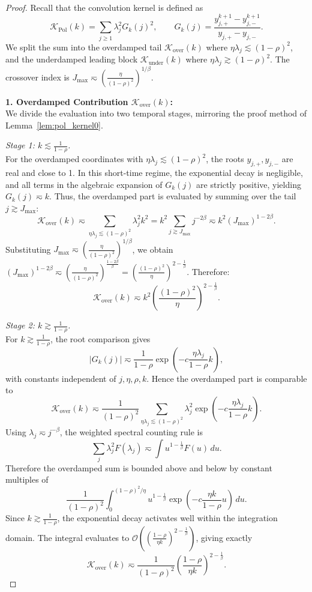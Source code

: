 \begin{proof}
Recall that the convolution kernel is defined as
\[
    \mathcal K_{\mathrm{Pol}}(k)=\sum_{j\ge1}\lambda_j^2G_k(j)^2,
    \qquad
    G_k(j)=\frac{y_{j,+}^{k+1}-y_{j,-}^{k+1}}{y_{j,+}-y_{j,-}}.
\]
We split the sum into the overdamped tail $\mathcal{K}_{\mathrm{over}}(k)$ where $\eta\lambda_j\lesssim(1-\rho)^2$, and the underdamped leading block $\mathcal{K}_{\mathrm{under}}(k)$ where $\eta\lambda_j\gtrsim(1-\rho)^2$. The crossover index is $J_{\max} \eqsim \left(\frac{\eta}{(1-\rho)^2}\right)^{1/\beta}$.

\textbf{1. Overdamped Contribution $\mathcal{K}_{\mathrm{over}}(k)$:} \\
We divide the evaluation into two temporal stages, mirroring the proof method of Lemma~\ref{lem:pol_kernel0}.

\textit{Stage 1: $k \lesssim \frac{1}{1-\rho}$.} \\
For the overdamped coordinates with $\eta\lambda_j\lesssim (1-\rho)^2$, the roots $y_{j,+}, y_{j,-}$ are real and close to 1. In this short-time regime, the exponential decay is negligible, and all terms in the algebraic expansion of $G_k(j)$ are strictly positive, yielding $G_k(j) \eqsim k$. Thus, the overdamped part is evaluated by summing over the tail $j \gtrsim J_{\max}$:
\[
    \mathcal{K}_{\mathrm{over}}(k) \eqsim \sum_{\eta\lambda_j\lesssim (1-\rho)^2} \lambda_j^2 k^2 = k^2 \sum_{j \gtrsim J_{\max}} j^{-2\beta} \eqsim k^2 (J_{\max})^{1-2\beta}.
\]
Substituting $J_{\max} \eqsim \left(\frac{\eta}{(1-\rho)^2}\right)^{1/\beta}$, we obtain $(J_{\max})^{1-2\beta} \eqsim \left(\frac{\eta}{(1-\rho)^2}\right)^{\frac{1-2\beta}{\beta}} = \left(\frac{(1-\rho)^2}{\eta}\right)^{2-\frac1\beta}$. Therefore:
\[
    \mathcal{K}_{\mathrm{over}}(k) \eqsim k^2 \left(\frac{(1-\rho)^2}{\eta}\right)^{2-\frac1\beta}.
\]

\textit{Stage 2: $k \gtrsim \frac{1}{1-\rho}$.} \\
For $k \gtrsim \frac{1}{1-\rho}$, the root comparison gives
\[
    |G_k(j)|
    \eqsim
    \frac{1}{1-\rho}
    \exp\left(-c\frac{\eta\lambda_j}{1-\rho}k\right),
\]
with constants independent of $j,\eta,\rho,k$. Hence the overdamped part is comparable to
\[
    \mathcal{K}_{\mathrm{over}}(k)
    \eqsim
    \frac{1}{(1-\rho)^2}
    \sum_{\eta\lambda_j\lesssim (1-\rho)^2}
    \lambda_j^2
    \exp\left(-c\frac{\eta\lambda_j}{1-\rho}k\right).
\]
Using $\lambda_j\eqsim j^{-\beta}$, the weighted spectral counting rule is
\[
    \sum_j \lambda_j^2 F(\lambda_j)
    \eqsim
    \int u^{1-\frac1\beta}F(u)\,du .
\]
Therefore the overdamped sum is bounded above and below by constant multiples of
\[
    \frac{1}{(1-\rho)^2}
    \int_0^{(1-\rho)^2/\eta}
    u^{1-\frac1\beta}
    \exp\left(-c\frac{\eta k}{1-\rho}u\right)\,du .
\]
Since $k \gtrsim \frac{1}{1-\rho}$, the exponential decay activates well within the integration domain. The integral evaluates to $\mathcal{O}\left( \left(\frac{1-\rho}{\eta k}\right)^{2-\frac1\beta} \right)$, giving exactly
\begin{equation*}
    \mathcal K_{\mathrm{over}}(k)
    \eqsim
    \frac{1}{(1-\rho)^2}
    \left(\frac{1-\rho}{\eta k}\right)^{2-\frac1\beta}.
\end{equation*}


\end{proof}
